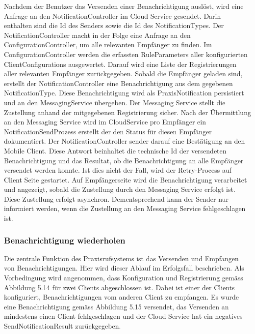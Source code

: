 Nachdem der Benutzer das Versenden einer Benachrichtigung auslöst, wird eine Anfrage an den NotificationController im Cloud Service gesendet.
Darin enthalten sind die Id des Senders sowie die Id des NotificationTypes.
Der NotificationController macht in der Folge eine Anfrage an den ConfigurationController, um alle relevanten Empfänger zu finden.
Im ConfigurationController werden die erfassten RuleParameters aller konfigurierten ClientConfigurations ausgewertet.
Darauf wird eine Liste der Registrierungen aller relevanten Empfänger zurückgegeben.
Sobald die Empfänger geladen sind, erstellt der NotificationController eine Benachrichtigung aus dem gegebenen NotificationType.
Diese Benachrichtigung wird als PraxisNotification persistiert und an den MessagingService übergeben.
Der Messaging Service stellt die Zustellung anhand der mitgegebenen Registrierung sicher.
Nach der Übermittlung an den Messaging Service wird im CloudService pro Empfänger ein NotificationSendProzess erstellt der den Status für diesen Empfänger dokumentiert.
Der NotificationController sender darauf eine Bestätigung an den Mobile Client.
Diese Antwort beinhaltet die technische Id der versendeten Benachrichtigung und das Resultat, ob die Benachrichtigung an alle Empfänger versendet werden konnte.
Ist dies nicht der Fall, wird der Retry-Process auf Client Seite gestartet.
Auf Empfängerseite wird die Benachrichtigung verarbeitet und angezeigt, sobald die Zustellung durch den Messaging Service erfolgt ist.
Diese Zustellung erfolgt asynchron.
Dementsprechend kann der Sender nur informiert werden, wenn die Zustellung an den Messaging Service fehlgeschlagen ist.

\clearpage
\subsubsection*{Benachrichtigung wiederholen}

Die zentrale Funktion des Praxisrufsystems ist das Versenden und Empfangen von Benachrichtigungen.
Hier wird dieser Ablauf im Erfolgsfall beschrieben.
Als Vorbedingung wird angenommen, dass Konfiguration und Registrierung gemäss Abbildung 5.14 für zwei Clients abgeschlossen ist.
Dabei ist einer der Clients konfiguriert, Benachrichtigungen vom anderen Client zu empfangen.
Es wurde eine Benachrichtigung gemäss Abbildung 5.15 versendet, das Versenden an mindestens einen Client fehlgeschlagen
und der Cloud Service hat ein negatives SendNotificationResult zurückgegeben.


